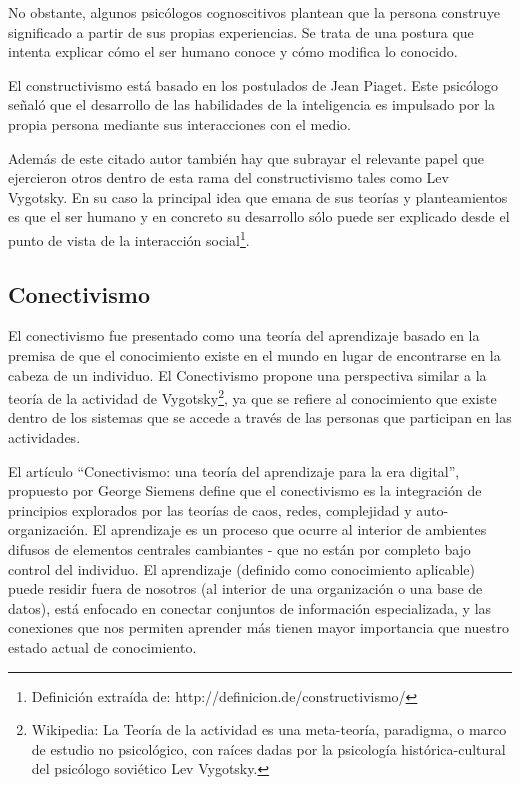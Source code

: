 No obstante, algunos psicólogos cognoscitivos plantean que la persona construye
significado a partir de sus propias experiencias. Se trata de una postura que
intenta explicar cómo el ser humano conoce y cómo modifica lo
conocido\cite{Rojas}.

El constructivismo está basado en los postulados de Jean Piaget. Este psicólogo
señaló que el desarrollo de las habilidades de la inteligencia es impulsado por
la propia persona mediante sus interacciones con el medio.

Además de este citado autor también hay que subrayar el relevante papel que
ejercieron otros dentro de esta rama del constructivismo tales como Lev
Vygotsky. En su caso la principal idea que emana de sus teorías y 
planteamientos es que el ser humano y en concreto su desarrollo sólo puede ser
explicado desde el punto de vista de la interacción social\footnote{Definición
extraída de: http://definicion.de/constructivismo/}.


\subsection{Conectivismo}

El conectivismo fue presentado como una teoría del aprendizaje basado en la
premisa de que el conocimiento existe en el mundo en lugar de encontrarse en la
cabeza de un individuo. El Conectivismo propone una perspectiva similar a la
teoría de la actividad de Vygotsky\footnote{Wikipedia: La Teoría de la actividad
es una meta-teoría, paradigma, o marco de estudio no psicológico, con raíces
dadas por la psicología histórica-cultural del psicólogo soviético Lev
Vygotsky.}, ya que se refiere al conocimiento que existe dentro de los sistemas
que se accede a través de las personas que participan en las actividades.

El artículo “Conectivismo: una teoría del aprendizaje para la era digital”,
propuesto por George Siemens define que el conectivismo es la integración de
principios explorados por las teorías de caos, redes, complejidad y auto-
organización. El aprendizaje es un proceso que ocurre al interior de ambientes
difusos de elementos centrales cambiantes - que no están por completo bajo
control del individuo. El aprendizaje (definido como conocimiento aplicable)
puede residir fuera de nosotros (al interior de una organización o una base de
datos), está enfocado en conectar conjuntos de información especializada, y las
conexiones que nos permiten aprender más tienen mayor importancia que nuestro
estado actual de conocimiento.

